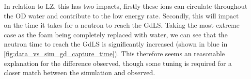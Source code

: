 \par
In relation to LZ, this has two impacts, firstly these ions can circulate throughout the OD water and contribute to the low energy rate.
Secondly, this will impact on the time it takes for a neutron to reach the GdLS.
Taking the most extreme case as the foam being completely replaced with water, we can see that the neutron time to reach the GdLS is significantly increased (shown in blue in \autoref{fig:data_vs_sim_gd_capture_time}).
This therefore seems an reasonable explanation for the difference observed, though some tuning is required for a closer match between the simulation and observed.





